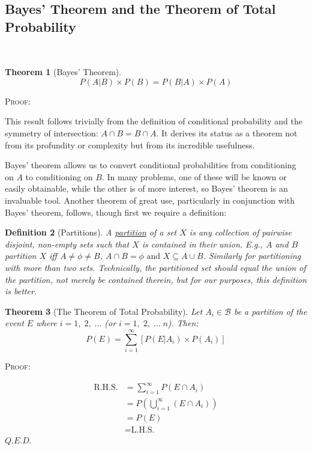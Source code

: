\documentclass[12pt,a4paper]{article}
\newtheorem{thm}{Theorem}[subsection]
\newtheorem{defn}[thm]{Definition}
\begin{document}
\subsection{Bayes' Theorem and the Theorem of Total Probability}\label{total prob}$\;$

\begin{thm}[Bayes' Theorem]
$$P(A|B) \times P(B) = P(B|A) \times P(A)$$
\end{thm}

\noindent \textsc{Proof:}\par
\vspace{12pt}
\indent This result follows trivially from the definition of conditional probability and the symmetry of intersection: $A \cap B = B \cap A$. It derives its status as a theorem not from its profundity or complexity but from its incredible usefulness.

Bayes' theorem allows us to convert conditional probabilities from conditioning on $A$ to conditioning on $B$. In many problems, one of these will be known or easily obtainable, while the other is of more interest, so Bayes' theorem is an invaluable tool. Another theorem of great use, particularly in conjunction with Bayes' theorem, follows, though first we require a definition:

\begin{defn}[Partitions]

A \underline{partition} of a set $X$ is any collection of pairwise disjoint, non-empty sets such that $X$ is contained in their union. E.g., $A$ and $B$ partition $X$ iff $A\neq \phi \neq B$, $A \cap B = \phi \text{ and } X \subseteq A \cup B$. Similarly for partitioning with more than two sets. Technically, the partitioned set should \emph{equal} the union of the partition, not merely be contained therein, but for our purposes, this definition is better.

\end{defn}

\begin{thm}[The Theorem of Total Probability]

Let $A_i \in \mathcal{B}$ be a partition of the event $E$ where $i = 1,\;2,\;...$ (or $i = 1,\;2,\;...\;n$). Then:
$$P(E) = \sum_{i=1}^{\infty}[P(E|A_i) \times P(A_i)]$$
\end{thm}

\textsc{Proof:}\par
\vspace{12pt}
\begin{align*}
\text{R.H.S.} &= \sum_{i=1}^{\infty}P(E \cap A_i)\\
&= P\left(\bigcup_{i=1}^{\infty}(E\cap A_i)\right)\\
&= P(E)\\
&= \text{L.H.S.}
\end{align*}
\hfill $Q.E.D.$
\end{document}
